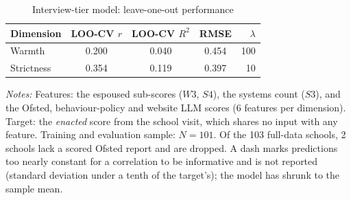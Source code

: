 \begin{table}[htbp]
\centering\caption{Interview-tier model: leave-one-out performance}
\label{tab:interview_model_loo}

\small
\begin{tabular}{lcccr}
\toprule
Dimension & LOO-CV $r$ & LOO-CV $R^2$ & RMSE & $\lambda$ \\
\midrule
Warmth     & 0.200 & 0.040 & 0.454 & 100 \\
Strictness & 0.354 & 0.119 & 0.397 & 10 \\
\bottomrule
\end{tabular}
\begin{minipage}{\linewidth}
\smallskip
\footnotesize\textit{Notes:} Features: the espoused sub-scores ($W3$, $S4$), the systems count ($S3$), and the Ofsted, behaviour-policy and website LLM scores (6 features per dimension). Target: the \emph{enacted} score from the school visit, which shares no input with any feature. Training and evaluation sample: $N = 101$. Of the 103 full-data schools, 2 schools lack a scored Ofsted report and are dropped. A dash marks predictions too nearly constant for a correlation to be informative and is not reported (standard deviation under a tenth of the target's); the model has shrunk to the sample mean.
\end{minipage}
\end{table}